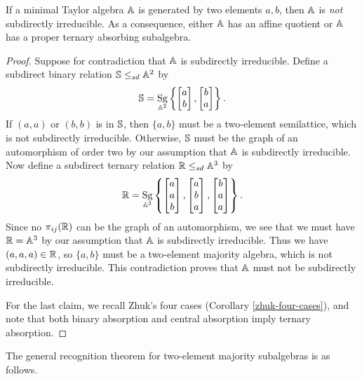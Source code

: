 \documentclass[letterpaper,11pt]{article}
\DeclareMathOperator{\Sg}{Sg}
\begin{document}
\begin{cor}\label{not-sd-complete} If a minimal Taylor algebra $\mathbb{A}$ is generated by two elements $a,b$, then $\mathbb{A}$ is \emph{not} subdirectly irreducible. As a consequence, either $\mathbb{A}$ has an affine quotient or $\mathbb{A}$ has a proper ternary absorbing subalgebra.
\end{cor}
\begin{proof} Suppose for contradiction that $\mathbb{A}$ is subdirectly irreducible. Define a subdirect binary relation $\mathbb{S} \le_{sd} \mathbb{A}^2$ by
\[
\bS = \Sg_{\bA^2}\left\{\begin{bmatrix} a\\ b\end{bmatrix}, \begin{bmatrix} b\\ a\end{bmatrix}\right\}.
\]
If $(a,a)$ or $(b,b)$ is in $\mathbb{S}$, then $\{a,b\}$ must be a two-element semilattice, which is not subdirectly irreducible. Otherwise, $\mathbb{S}$ must be the graph of an automorphism of order two by our assumption that $\mathbb{A}$ is subdirectly irreducible. Now define a subdirect ternary relation $\mathbb{R} \le_{sd} \mathbb{A}^3$ by
\[
\RR = \Sg_{\bA^3}\left\{\begin{bmatrix} a\\ a\\ b\end{bmatrix}, \begin{bmatrix} a\\ b\\ a\end{bmatrix}, \begin{bmatrix} b\\ a\\ a\end{bmatrix}\right\}.
\]
Since no $\pi_{ij}(\mathbb{R})$ can be the graph of an automorphism, we see that we must have $\mathbb{R} = \mathbb{A}^3$ by our assumption that $\mathbb{A}$ is subdirectly irreducible. Thus we have $(a,a,a) \in \mathbb{R}$, so $\{a,b\}$ must be a two-element majority algebra, which is not subdirectly irreducible. This contradiction proves that $\mathbb{A}$ must not be subdirectly irreducible.

For the last claim, we recall Zhuk's four cases (Corollary \ref{zhuk-four-cases}), and note that both binary absorption and central absorption imply ternary absorption.
\end{proof}

The general recognition theorem for two-element majority subalgebras is as follows.
\end{document}
